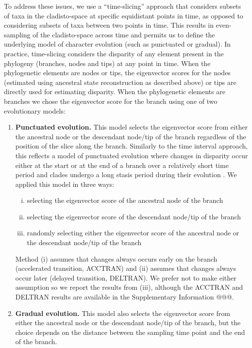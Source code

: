 \documentclass[12pt,letterpaper]{article}
\begin{document}
To address these issues, we use a ``time-slicing'' approach that considers subsets of taxa in the cladisto-space at specific equidistant points in time, as opposed to considering subsets of taxa between two points in time.
This results in even-sampling of the cladisto-space across time and permits us to define the underlying model of character evolution (such as punctuated or gradual).  
In practice, time-slicing considers the disparity of any element present in the phylogeny (branches, nodes and tips) at any point in time.
When the phylogenetic elements are nodes or tips, the eigenvector scores for the nodes (estimated using ancestral state reconstruction as described above) or tips are directly used for estimating disparity.
When the phylogenetic elements are branches we chose the eigenvector score for the branch using one of two evolutionary models:
\begin{enumerate}
    \item{\textbf{Punctuated evolution.}} 
    This model selects the eigenvector score from either the ancestral node or the descendant node/tip of the branch regardless of the position of the slice along the branch. 
    Similarly to the time interval approach, this reflects a model of punctuated evolution where changes in disparity occur either at the start or at the end of a branch over a relatively short time period and clades undergo a long stasis period during their evolution \citep{Gould1977,Hunt20112007}.
    We applied this model in three ways: 
    \begin{enumerate}[(i)]
      \item selecting the eigenvector score of the ancestral node of the branch
      \item selecting the eigenvector score of the descendant node/tip of the branch
      \item randomly selecting either the eigenvector score of the ancestral node or the descendant node/tip of the branch
    \end{enumerate}
    Method (i) assumes that changes always occurs early on the branch (accelerated transition, ACCTRAN) and (ii) assumes that changes always occur later (delayed transition, DELTRAN).
    We prefer not to make either assumption so we report the results from (iii), although the ACCTRAN and DELTRAN results are available in the Supplementary Information @@@. %
    \item{\textbf{Gradual evolution.}}
    This model also selects the eigenvector score from either the ancestral node or the descendant node/tip of the branch, but the choice depends on the distance between the sampling time point and the end of the branch.

\end{enumerate}
\end{document}
